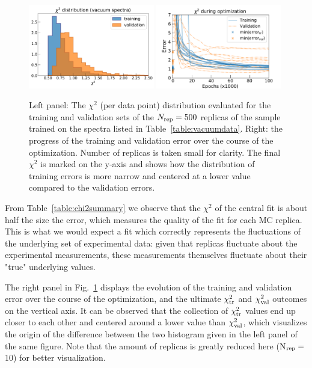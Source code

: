 \begin{figure}[H]
    \centering
    \includegraphics[width=0.49\textwidth]{plots/chi2_distributions.pdf}
    \includegraphics[width=0.49\textwidth]{plots/train_val_error_271.pdf}
    \caption{Left panel: The $\chi^2$ (per data point) distribution evaluated for the training and validation sets
      of the $N_{\rm rep}=500$ replicas of the sample trained on the spectra
      listed in Table~\ref{table:vacuumdata}. Right: the progress of the training and validation error over
      the course of the optimization. Number of replicas is taken small for clarity.
      The final $\chi^2$ is marked on the y-axis and shows how the distribution of training errors
      is more narrow and centered at a lower value compared to the validation errors. }
    \label{fig:chi2_distributions}
\end{figure}


From Table~\ref{table:chi2summary} we observe that the $\chi^2$ of the central fit is about half the size 
the error, which measures the quality of the fit for each MC replica. 
%
This is what we would expect a fit which correctly represents the fluctuations of the underlying set
of experimental data:
given that replicas fluctuate about the experimental measurements, these measurements themselves 
fluctuate about their "true" underlying values. 

The right panel in Fig.~\ref{fig:chi2_distributions} displays the evolution of the training and validation
error over the course of the optimization, and the ultimate $\chi^2_{\rm tr}$ and $\chi^2_{\rm val}$ outcomes
on the vertical axis. 
%
It can be observed that the collection of $\chi^2_{\rm tr}$ values end up closer to each other and centered around 
a lower value than $\chi^2_{\rm val}$, which visualizes the origin of the difference between the two 
histogram given in the left panel of the same figure. 
%
Note that the amount of replicas is greatly reduced here (N$_{\rm rep}=$10) for better visualization.

